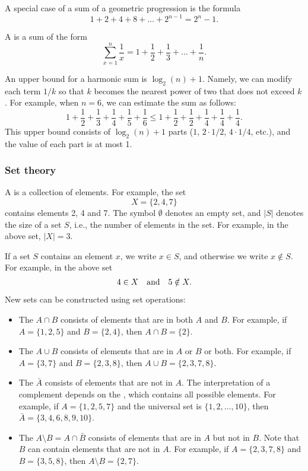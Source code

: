 A special case of a sum of a geometric progression is the formula
\[1+2+4+8+\ldots+2^{n-1}=2^n-1.\]


A  is a sum of the form
\[ \sum_{x=1}^n \frac{1}{x} = 1+\frac{1}{2}+\frac{1}{3}+\ldots+\frac{1}{n}.\]

An upper bound for a harmonic sum is $\log_2(n)+1$.
Namely, we can
modify each term $1/k$ so that $k$ becomes
the nearest power of two that does not exceed $k$.
For example, when $n=6$, we can estimate
the sum as follows:
\[ 1+\frac{1}{2}+\frac{1}{3}+\frac{1}{4}+\frac{1}{5}+\frac{1}{6} \le
1+\frac{1}{2}+\frac{1}{2}+\frac{1}{4}+\frac{1}{4}+\frac{1}{4}.\]
This upper bound consists of $\log_2(n)+1$ parts
($1$, $2 \cdot 1/2$, $4 \cdot 1/4$, etc.),
and the value of each part is at most 1.

\subsubsection{Set theory}


A  is a collection of elements.
For example, the set
\[X=\{2,4,7\}\]
contains elements 2, 4 and 7.
The symbol $\emptyset$ denotes an empty set,
and $|S|$ denotes the size of a set $S$,
i.e., the number of elements in the set.
For example, in the above set, $|X|=3$.

If a set $S$ contains an element $x$,
we write $x \in S$,
and otherwise we write $x \notin S$.
For example, in the above set
\[4 \in X \hspace{10px}\textrm{and}\hspace{10px} 5 \notin X.\]

\begin{samepage}
New sets can be constructed using set operations:
\begin{itemize}
\item The  $A \cap B$ consists of elements
that are in both $A$ and $B$.
For example, if $A=\{1,2,5\}$ and $B=\{2,4\}$,
then $A \cap B = \{2\}$.
\item The  $A \cup B$ consists of elements
that are in $A$ or $B$ or both.
For example, if $A=\{3,7\}$ and $B=\{2,3,8\}$,
then $A \cup B = \{2,3,7,8\}$.
\item The  $\bar A$ consists of elements
that are not in $A$.
The interpretation of a complement depends on
the , which contains all possible elements.
For example, if $A=\{1,2,5,7\}$ and the universal set is
$\{1,2,\ldots,10\}$, then $\bar A = \{3,4,6,8,9,10\}$.
\item The  $A \setminus B = A \cap \bar B$
consists of elements that are in $A$ but not in $B$.
Note that $B$ can contain elements that are not in $A$.
For example, if $A=\{2,3,7,8\}$ and $B=\{3,5,8\}$,
then $A \setminus B = \{2,7\}$.
\end{itemize}
\end{samepage}


